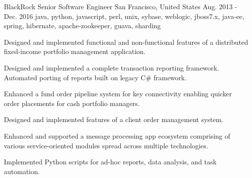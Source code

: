 \cventry
    {BlackRock} %
    {Senior Software Engineer} %
    {San Francisco, United States} %
    {Aug. 2013 - Dec. 2016} %
    {java, python, javascript, perl, unix, sybase, weblogic, jboss7.x, java-ee, spring, hibernate, apache-zookeeper, guava, sharding}%
    {
    \begin{cvitems} %
        \item {Designed and implemented functional and non-functional features of a distributed fixed-income portfolio management application. }
        \item {Designed and implemented a complete transaction reporting framework. Automated porting of reports built on legacy C\# framework. }
        \item {Enhanced a fund order pipeline system for key connectivity enabling quicker order placements for cash portfolio managers.}
        \item {Designed and implemented features of a client order management system. }
        \item {Enhanced and supported a message processing app ecosystem comprising of various service-oriented modules spread across multiple technologies. }
        \item {Implemented Python scripts for ad-hoc reports, data analysis, and task automation.}
    \end{cvitems}
    }